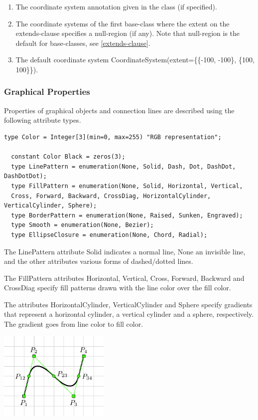\documentclass[10pt,a4paper]{report}
\def\doublelabel#1{\label{#1}}
\renewcommand{\labelenumi}{\arabic{enumi}.}
\begin{document}
\begin{enumerate}
\def\labelenumi{\arabic{enumi}.}
\item
  The coordinate system annotation given in the class (if specified).
\item
  The coordinate systems of the first base-class where the extent on the
  extends-clause specifies a null-region (if any). Note that null-region
  is the default for base-classes, see \ref{extends-clause}.
\item
  The default coordinate system CoordinateSystem(extent=\{\{-100,
  -100\}, \{100, 100\}\}).
\end{enumerate}

\subsubsection{Graphical Properties}\doublelabel{graphical-properties}

Properties of graphical objects and connection lines are described using
the following attribute types.

\begin{lstlisting}[language=modelica]
  type Color = Integer[3](min=0, max=255) "RGB representation";

  constant Color Black = zeros(3);
  type LinePattern = enumeration(None, Solid, Dash, Dot, DashDot, DashDotDot);
  type FillPattern = enumeration(None, Solid, Horizontal, Vertical,
  Cross, Forward, Backward, CrossDiag, HorizontalCylinder, VerticalCylinder, Sphere);
  type BorderPattern = enumeration(None, Raised, Sunken, Engraved);
  type Smooth = enumeration(None, Bezier);
  type EllipseClosure = enumeration(None, Chord, Radial);
\end{lstlisting}
The LinePattern attribute Solid indicates a normal line, None an
invisible line, and the other attributes various forms of dashed/dotted
lines.

The FillPattern attributes Horizontal, Vertical, Cross, Forward,
Backward and CrossDiag specify fill patterns drawn with the line color
over the fill color.

The attributes HorizontalCylinder, VerticalCylinder and Sphere specify
gradients that represent a horizontal cylinder, a vertical cylinder and
a sphere, respectively. The gradient goes from line color to fill color.

\includegraphics[width=2.08333in,height=1.66667in]{media/bezierpoints}
\end{document}
